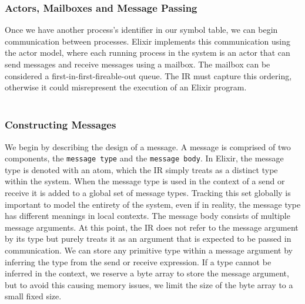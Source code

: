 \subsubsection{Actors, Mailboxes and Message Passing}
Once we have another process's identifier in our symbol table, we can begin communication between processes. Elixir implements this communication using the actor model, where each running process in the system is an actor that can send messages and receive messages using a mailbox. The mailbox can be considered a first-in-first-fireable-out queue. The IR must capture this ordering, otherwise it could misrepresent the execution of an Elixir program.
\\ \\
\subsubsection{Constructing Messages}
We begin by describing the design of a message. A message is comprised of two components, the \texttt{message type} and the \texttt{message body}. In Elixir, the message type is denoted with an atom, which the IR simply treats as a distinct type within the system. When the message type is used in the context of a send or receive it is added to a global set of message types. Tracking this set globally is important to model the entirety of the system, even if in reality, the message type has different meanings in local contexts. The message body consists of multiple message arguments. At this point, the IR does not refer to the message argument by its type but purely treats it as an argument that is expected to be passed in communication. We can store any primitive type within a message argument by inferring the type from the send or receive expression. If a type cannot be inferred in the context, we reserve a byte array to store the message argument, but to avoid this causing memory issues, we limit the size of the byte array to a small fixed size.
\\ \\
